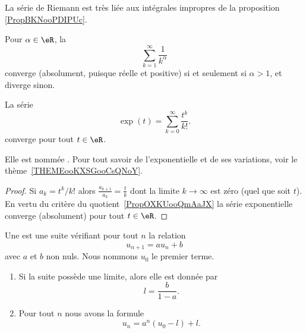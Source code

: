 La série de Riemann est très liée aux intégrales impropres de la proposition \ref{PropBKNooPDIPUc}.
\begin{proposition} \label{PROPooFPVZooGnsqrs}      \label{EXooCTYNooCjYQvJ}
	Pour \( \alpha \in \eR\), la 
	\begin{equation}        \label{EqSerRiem}
		\sum_{k=1}^\infty \frac{ 1 }{ k^{\alpha}}
	\end{equation}
	converge (absolument, puisque réelle et positive) si et seulement si \( \alpha > 1\), et diverge sinon.
\end{proposition}

\begin{lemma} \label{ExIJMHooOEUKfj}
    La série
	\begin{equation}
		\exp(t)=\sum_{k=0}^{\infty}\frac{ t^k }{ k! }.
	\end{equation}
    converge pour tout \( t\in \eR\). 

    Elle est nommée . Pour tout savoir de l'exponentielle et de ses variations, voir le thème~\ref{THEMEooKXSGooCsQNoY}.
\end{lemma}

\begin{proof}
    Si \( a_k=t^k/k!\) alors \( \frac{ a_{k+1} }{ a_k }=\frac{ t }{ k }\) dont la limite \( k\to \infty\) est zéro (quel que soit \( t\)). En vertu du critère du quotient~\ref{PropOXKUooQmAaJX} la série exponentielle converge (absolument) pour tout \( t\in \eR\).
\end{proof}

\begin{lemma}      \label{LEMooCVIQooUtuzgE}
	Une  est une suite vérifiant pour tout \( n\) la relation
	\begin{equation}
		u_{n+1}=au_n+b
	\end{equation}
    avec \( a\) et \( b\) non nuls. Nous nommons \( u_0\) le premier terme.
    
    \begin{enumerate}
        \item
            Si la suite possède une limite, alors elle est donnée par
            \begin{equation}    \label{EQooMZSSooOWpZUp}
                l=\frac{ b }{ 1-a }.
            \end{equation}
        \item
            Pour tout \( n\) nous avons la formule
            \begin{equation}
                u_n=a^n(u_0-l)+l.
            \end{equation}
    \end{enumerate}
\end{lemma}


